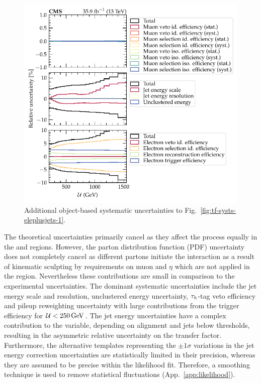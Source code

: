 \begin{figure}
    \centering
    \includegraphics{chapters/042_backgrounds/images/tf_wj_ele_met_systs2.pdf}
    \caption[Object-based uncertainties on the transfer factors]{
        Additional object-based systematic uncertainties to Fig.~\ref{fig:tf-systs-eleplusjets-1}.
    }
    \label{fig:tf-systs-eleplusjets-2}
\end{figure}
%
The theoretical uncertainties primarily cancel as they affect the \IWj process equally in the \metplusjets and \muplusjets regions. However, the parton distribution function (PDF) uncertainty does not completely cancel as different partons initiate the interaction as a result of kinematic sculpting by requirements on muon \pt and $\eta$ which are not applied in the \metplusjets region. Nevertheless these contributions are small in comparison to the experimental uncertainties. The dominant systematic uncertainties include the jet energy scale and resolution, unclustered energy uncertainty, $\tau_h$-tag veto efficiency and pileup reweighting uncertainty with large contributions from the \ptmiss trigger efficiency for ${\mathcal{U}<\SI{250}{GeV}}$. The jet energy uncertainties have a complex contribution to the \recoil variable, depending on alignment and jets below thresholds, resulting in the asymmetric relative uncertainty on the transfer factor. Furthermore, the alternative templates representing the $\pm 1\sigma$ variations in the jet energy correction uncertainties are statistically limited in their precision, whereas they are assumed to be precise within the likelihood fit. Therefore, a smoothing technique is used to remove statistical fluctuations (App.~\ref{app:likelihood}).

